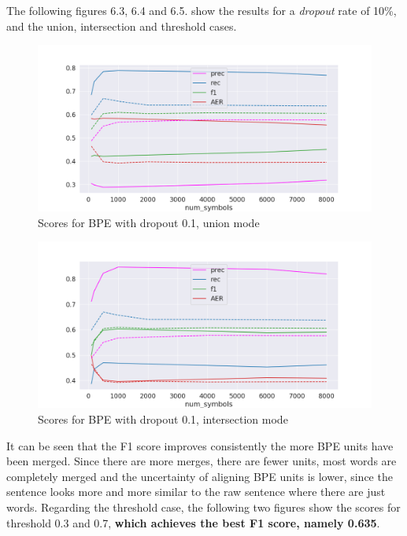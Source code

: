 The following figures 6.3, 6.4 and 6.5. show the results for a \emph{dropout} rate of 10\%, and the union, intersection and threshold cases.

 \begin{figure}[!ht]
     \centering
     \includegraphics[width=12cm]{../reports/scores_dropout_bpe/space/0.1/union_fastalign.png}
     \caption{Scores for BPE with dropout 0.1, union mode}
 \end{figure}
 
 \begin{figure}[!ht]
     \centering
     \includegraphics[width=11.5cm]{../reports/scores_dropout_bpe/space/0.1/inter_fastalign.png}
     \caption{Scores for BPE with dropout 0.1, intersection mode}
 \end{figure}

It can be seen that the F1 score improves consistently the more BPE units have been merged. Since there are more merges, there are fewer units, most words are completely merged and the uncertainty of aligning BPE units is lower, since the sentence looks more and more similar to the raw sentence where there are just words. Regarding the threshold case, the following two figures show the scores for threshold 0.3 and 0.7, \textbf{which achieves the best F1 score, namely 0.635}.

